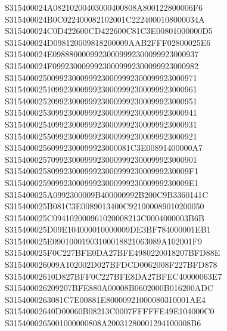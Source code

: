 \documentclass[12pt,a4paper]{article}
\begin{document}
\begin{framed}
{S315400024A08210200403000400808A800122800006F6\newline
S315400024B0C022400082102001C2224000108000034A\newline
S315400024C0D422600CD422600C81C3E00801000000D5\newline
S315400024D098120009818200009AAB2FFF02800025E6\newline
S315400024E09888000099230009992300099923000937\newline
S315400024F09923000999230009992300099923000982\newline
S315400025009923000999230009992300099923000971\newline
S315400025109923000999230009992300099923000961\newline
S315400025209923000999230009992300099923000951\newline
S315400025309923000999230009992300099923000941\newline
S315400025409923000999230009992300099923000931\newline
S315400025509923000999230009992300099923000921\newline
S31540002560992300099923000081C3E00891400000A7\newline
S315400025709923000999230009992300099923000901\newline
S3154000258099230009992300099923000999230009F1\newline
S3154000259099230009992300099923000999230009E1\newline
S315400025A0992300009B400000992B200C9B3360141C\newline
S315400025B081C3E0089013400C921000089010200050\newline
S315400025C094102000961020008213C0004000003B6B\newline
S315400025D09E104000010000009DE3BF784000001EB1\newline
S315400025E09010001903100018821063089A102001F9\newline
S315400025F0C227BFE0DA27BFE4980220018207BFD88E\newline
S315400026009A102002D027BFDCD0062008F227BFD878\newline
S31540002610D827BFF0C227BFE8DA27BFEC40000063E7\newline
S315400026209207BFE880A00008B0602000B016200ADC\newline
S3154000263081C7E00881E80000921000080310001AE4\newline
S31540002640D00060B08213C0007FFFFFE49E104000C0\newline
S3154000265001000000808A20031280001294100008B6\newline
}
\end{framed}
\end{document}
